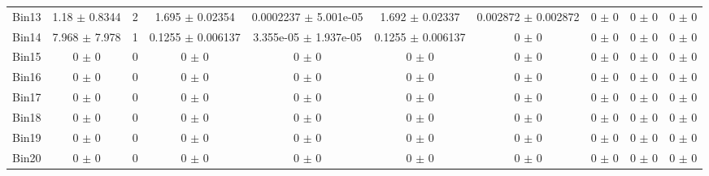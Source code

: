 \begin{tabular}{@{\extracolsep{4pt}}lccccccccc@{}}
     Bin13 & 1.18 $\pm$ 0.8344 & 2 & 1.695 $\pm$ 0.02354 & 0.0002237 $\pm$ 5.001e-05 & 1.692 $\pm$ 0.02337 & 0.002872 $\pm$ 0.002872 & 0 $\pm$ 0 & 0 $\pm$ 0 & 0 $\pm$ 0 \\ 
     Bin14 & 7.968 $\pm$ 7.978 & 1 & 0.1255 $\pm$ 0.006137 & 3.355e-05 $\pm$ 1.937e-05 & 0.1255 $\pm$ 0.006137 & 0 $\pm$ 0 & 0 $\pm$ 0 & 0 $\pm$ 0 & 0 $\pm$ 0 \\ 
     Bin15 & 0 $\pm$ 0 & 0 & 0 $\pm$ 0 & 0 $\pm$ 0 & 0 $\pm$ 0 & 0 $\pm$ 0 & 0 $\pm$ 0 & 0 $\pm$ 0 & 0 $\pm$ 0 \\ 
     Bin16 & 0 $\pm$ 0 & 0 & 0 $\pm$ 0 & 0 $\pm$ 0 & 0 $\pm$ 0 & 0 $\pm$ 0 & 0 $\pm$ 0 & 0 $\pm$ 0 & 0 $\pm$ 0 \\ 
     Bin17 & 0 $\pm$ 0 & 0 & 0 $\pm$ 0 & 0 $\pm$ 0 & 0 $\pm$ 0 & 0 $\pm$ 0 & 0 $\pm$ 0 & 0 $\pm$ 0 & 0 $\pm$ 0 \\ 
     Bin18 & 0 $\pm$ 0 & 0 & 0 $\pm$ 0 & 0 $\pm$ 0 & 0 $\pm$ 0 & 0 $\pm$ 0 & 0 $\pm$ 0 & 0 $\pm$ 0 & 0 $\pm$ 0 \\ 
     Bin19 & 0 $\pm$ 0 & 0 & 0 $\pm$ 0 & 0 $\pm$ 0 & 0 $\pm$ 0 & 0 $\pm$ 0 & 0 $\pm$ 0 & 0 $\pm$ 0 & 0 $\pm$ 0 \\ 
     Bin20 & 0 $\pm$ 0 & 0 & 0 $\pm$ 0 & 0 $\pm$ 0 & 0 $\pm$ 0 & 0 $\pm$ 0 & 0 $\pm$ 0 & 0 $\pm$ 0 & 0 $\pm$ 0 \\ 
\hline\hline
  \end{tabular}
